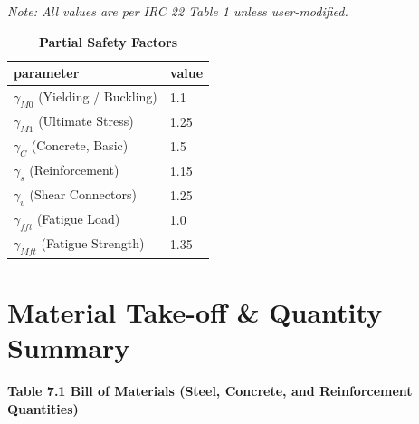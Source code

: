 \documentclass[12pt,a4paper]{report}
\numberwithin{table}{chapter}
\numberwithin{figure}{chapter}
\begin{document}
\label{subsec:safety-factors}

\vspace{2.2em}

\vspace{0.3em}
\noindent\textit{Note: All values are per IRC 22 Table 1 unless user-modified.}

\vspace{0.4em}
\begin{longtable}{|L{5.5cm}|p{10.0cm}|}
\caption{\textbf{Partial Safety Factors}}
\hline
\textbf{parameter} & \textbf{value} \\
\hline
\textnormal{$\gamma_{M0}$ (Yielding / Buckling)} & 1.1 \\[6pt]
\hline
\textnormal{$\gamma_{M1}$ (Ultimate Stress)} & 1.25 \\[6pt]
\hline
\textnormal{$\gamma_C$ (Concrete, Basic)} & 1.5 \\[6pt]
\hline
\textnormal{$\gamma_s$ (Reinforcement)} & 1.15 \\[6pt]
\hline
\textnormal{$\gamma_v$ (Shear Connectors)} & 1.25 \\[6pt]
\hline
\textnormal{$\gamma_{fft}$ (Fatigue Load)} & 1.0 \\[6pt]
\hline
\textnormal{$\gamma_{Mft}$ (Fatigue Strength)} & 1.35 \\[6pt]
\hline
\end{longtable}


\chapter{Material Take-off \& Quantity Summary}
\label{ch:material-takeoff}

\noindent\textbf{Table 7.1  Bill of Materials (Steel, Concrete, and Reinforcement Quantities)}
\end{document}
